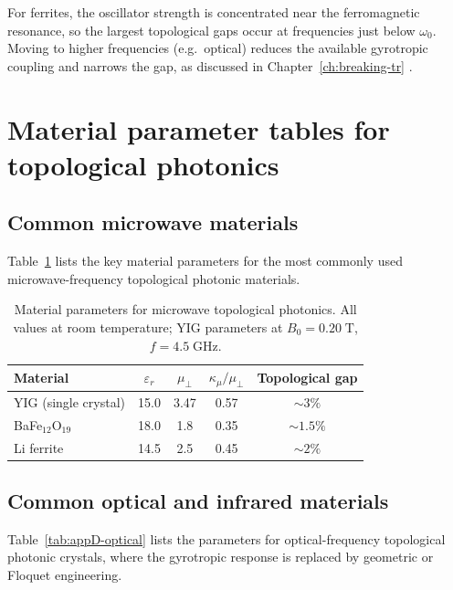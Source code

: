 For ferrites, the oscillator strength is concentrated near the
ferromagnetic resonance, so the largest topological gaps occur at
frequencies just below $\omega_0$.  Moving to higher frequencies
(e.g.\ optical) reduces the available gyrotropic coupling and
narrows the gap, as discussed in
Chapter~\ref{ch:breaking-tr} \cite{zhao2020first,price2022roadmap}.

\section{Material parameter tables for topological photonics}
\label{sec:appD-parameter-tables}

\subsection{Common microwave materials}
\label{sec:appD-microwave-table}

Table~\ref{tab:appD-microwave} lists the key material parameters for
the most commonly used microwave-frequency topological photonic
materials.

\begin{table}[htbp]
\centering
\caption{Material parameters for microwave topological photonics.
All values at room temperature; YIG parameters at $B_0=0.20\;\mathrm{T}$,
$f=4.5\;\mathrm{GHz}$.}
\label{tab:appD-microwave}
\begin{tabular}{lcccc}
\hline
Material & $\varepsilon_r$ & $\mu_\perp$ & $\kappa_\mu/\mu_\perp$
& Topological gap \\
\hline
YIG (single crystal) & 15.0 & 3.47 & 0.57 & $\sim 3\%$ \\
BaFe$_{12}$O$_{19}$ & 18.0 & 1.8 & 0.35 & $\sim 1.5\%$ \\
Li ferrite & 14.5 & 2.5 & 0.45 & $\sim 2\%$ \\
\hline
\end{tabular}
\end{table}

\subsection{Common optical and infrared materials}
\label{sec:appD-optical-table}

Table~\ref{tab:appD-optical} lists the parameters for optical-frequency
topological photonic crystals, where the gyrotropic response is replaced
by geometric or Floquet engineering.

